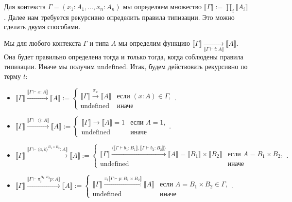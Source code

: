 \documentclass[openany]{book}
\theoremstyle{plain}
\theoremstyle{definition}
\begin{document}
Для контекста \(\Gamma = (x_1 : A_1, \dots, x_n : A_n)\) мы определяем множество \(\llbracket \Gamma \rrbracket := \prod_i \llbracket A_i \rrbracket\). Далее нам требуется рекурсивно определить правила типизации. Это можно сделать двумя способами. 

Мы для любого контекста \(\Gamma\) и типа \(A\) мы определим функцию \(\llbracket \Gamma \rrbracket \underset{\llbracket \Gamma \vdash t : A \rrbracket}{\to} \llbracket A \rrbracket\). Она будет правильно определена тогда и только тогда, когда соблюдены правила типизации. Иначе мы получим \(\mathrm{undefined}\). Итак, будем действовать рекурсивно по терму \(t\):
\begin{itemize}
    \item \(\llbracket \Gamma \rrbracket \overset{\llbracket \Gamma \vdash x : A \rrbracket}{\longrightarrow} \llbracket A \rrbracket := \begin{cases}\llbracket \Gamma \rrbracket \overset{\pi_x}{\longrightarrow} \llbracket A \rrbracket & \text{если }(x:A) \in \Gamma,\\ \text{undefined} & \text{иначе}\end{cases}.\)

    \item \(\llbracket \Gamma \rrbracket \overset{\llbracket \Gamma \vdash \langle \rangle : A \rrbracket}{\longrightarrow} \llbracket A \rrbracket := \begin{cases}\llbracket \Gamma \rrbracket \overset{}{\longrightarrow} \llbracket A \rrbracket = 1 & \text{если }A=1,\\ \text{undefined} & \text{иначе}\end{cases}.\)

    \item \(\llbracket \Gamma \rrbracket \overset{\llbracket \Gamma \vdash \langle a, b \rangle^{B_1 \times B_2} : A \rrbracket}{\longrightarrow} \llbracket A \rrbracket := \begin{cases}\llbracket \Gamma \rrbracket \overset{\langle \llbracket \Gamma \vdash b_1 : B_1 \rrbracket, \llbracket \Gamma \vdash b_2 : B_2 \rrbracket \rangle}{\longrightarrow} \llbracket A \rrbracket = \llbracket B_1 \rrbracket \times \llbracket B_2 \rrbracket & \text{если }A=B_1 \times B_2,\\ \text{undefined} & \text{иначе}\end{cases}.\)

    \item \(\llbracket \Gamma \rrbracket \overset{\llbracket \Gamma \vdash \pi_i^{B_1, B_2} p : A \rrbracket}{\longrightarrow} \llbracket A \rrbracket := \begin{cases}\llbracket \Gamma \rrbracket \overset{\pi_i \llbracket \Gamma \vdash p : B_1 \times B_2 \rrbracket}{\longrightarrow} \llbracket A \rrbracket & \text{если }A = B_1 \times B_2 \in \Gamma,\\ \text{undefined} & \text{иначе}\end{cases}.\)


\end{itemize}
\end{document}
